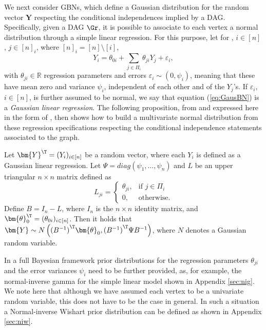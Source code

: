 We next consider \glspl{GBN}, which define a Gaussian distribution for the random vector $\bm{Y}$ respecting the conditional independences implied by a \gls{DAG}. Specifically, given a \gls{DAG} $\Gr$, it is possible to associate to each vertex a normal distribution through a simple linear regression. For this purpose, let for , $i\in[n]$, $j\in[n]_i$, where $[n]_i=[n]\setminus [i]$,
\begin{equation}
\label{eq:GausBN}
Y_i=\theta_{0i}+\sum_{j\in \Pi_i} \theta_{ji}Y_j+\varepsilon_i, 
\end{equation} 
with $\theta_{ji}\in\mathbb{R}$ regression parameters and  errors $\varepsilon_i\sim (0,\psi_i)$, meaning that these have mean zero and variance $\psi_i$, independent of each other and of the $Y_j$'s. If $\varepsilon_i$, $i\in[n]$, is further assumed to be normal, we say that equation (\ref{eq:GausBN}) is a \textit{Gaussian linear regression}. The following proposition, from \citet{Richardson2002}  and expressed here in the form of \citet{Sullivant2010}, then shows how to build a multivariate normal distribution from these regression specifications respecting the conditional independence statements associated to the graph.
\begin{proposition}
\label{proposition:ciao2}
Let $\bm{Y}^\T=(Y_i)_{i\in[n]}$ be a random vector, where each $Y_i$ is defined as a  Gaussian linear regression. Let $\Psi=diag(\psi_1,\dots, \psi_n)$ and $L$ be an upper triangular $n\times n$ matrix defined as
\begin{equation*}
\label{eq:Lji}
L_{ji}=\left\{
\begin{array}{ll}
\theta_{ji},& \mbox{if } j\in \Pi_i\\
0,&\mbox{otherwise.}
\end{array}
\right.
\end{equation*}
Define $B=I_n-L$, where $I_n$ is the $n\times n$ identity matrix, and $\bm{\theta}_0^\T=(\theta_{0i})_{i\in[n]}$. Then it holds that $\bm{Y}\sim N\left({(B^{-1})}^\T\bm{\theta}_0,{(B^{-1})}^\T\Psi B^{-1} \right)$, where $N$ denotes a Gaussian random variable. 
\end{proposition} 

In a full Bayesian framework prior distributions for the regression parameters $\theta_{ji}$ and the error variances $\psi_i$ need to be further provided, as, for example, the normal-inverse gamma for the simple linear model shown in Appendix \ref{sec:nig}. We note here that although we have assumed each vertex to be a univariate random variable, this does not have to be the case in general. In such a situation a Normal-inverse Wishart prior distribution can be defined as shown in Appendix \ref{sec:niw}. 

